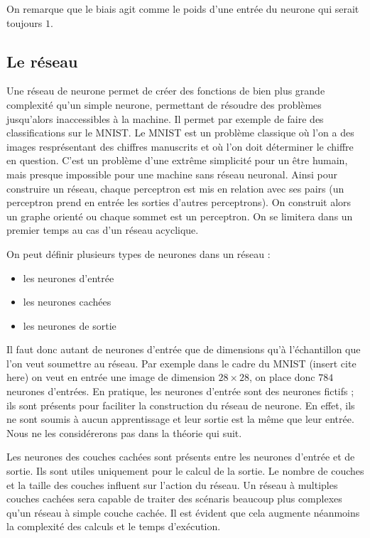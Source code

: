 On remarque que le biais agit comme le poids d'une entrée du neurone qui serait toujours $1$.

\subsection{Le réseau}

Une réseau de neurone permet de créer des fonctions de bien plus grande complexité qu'un simple neurone, permettant de résoudre des problèmes jusqu'alors inaccessibles à la machine. Il permet par exemple de faire des classifications sur le MNIST. Le MNIST est un problème classique où l'on a des images resprésentant des chiffres manuscrits et où l'on doit déterminer le chiffre en question. C'est un problème d'une extrême simplicité pour un être humain, mais presque impossible pour une machine sans réseau neuronal. Ainsi pour construire un réseau, chaque perceptron est mis en relation avec ses pairs (un perceptron prend en entrée les sorties d'autres perceptrons). On construit alors un graphe orienté ou chaque sommet est un perceptron. On se limitera dans un premier temps au cas d'un réseau acyclique.

\bigskip

On peut définir plusieurs types de neurones dans un réseau :
\begin{itemize}
\item les neurones d'entrée
\item les neurones cachées
\item les neurones de sortie
\end{itemize}

\bigskip

Il faut donc autant de neurones d'entrée que de dimensions qu'à l'échantillon que l'on veut soumettre au réseau. Par exemple dans le cadre du MNIST (insert cite here) on veut en entrée une image de dimension $28 \times 28$, on place donc $784$ neurones d'entrées. En pratique, les neurones d'entrée sont des neurones fictifs ; ils sont présents pour faciliter la construction du réseau de neurone. En effet, ils ne sont soumis à aucun apprentissage et leur sortie est la même que leur entrée. Nous ne les considérerons pas dans la théorie qui suit.

\medskip

Les neurones des couches cachées sont présents entre les neurones d'entrée et de sortie. Ils sont utiles uniquement pour le calcul de la sortie. Le nombre de couches et la taille des couches influent sur l'action du réseau. Un réseau à multiples couches cachées sera capable de traiter des scénaris beaucoup plus complexes qu'un réseau à simple couche cachée. Il est évident que cela augmente néanmoins la complexité des calculs et le temps d'exécution.

